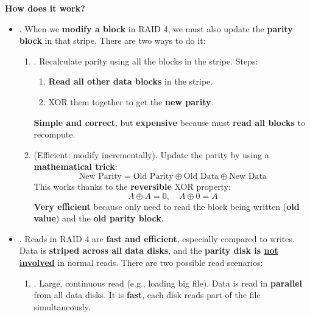 \newpage

\begin{flushleft}
    \textcolor{Green3}{ \textbf{How does it work?}}
\end{flushleft}
\begin{itemize}
    \item {}. When we \textbf{modify a block} in RAID 4, we must also update the \textbf{parity block} in that stripe. There are two ways to do it:
    \begin{enumerate}
        \item {}. Recalculate parity using all the blocks in the stripe. Steps:
        \begin{enumerate}
            \item \textbf{Read all other data blocks} in the stripe.
            \item XOR them together to get the \textbf{new parity}.
        \end{enumerate}
        \textcolor{Green3}{ \textbf{Simple and correct}}, but \textcolor{Red2}{ \textbf{expensive}} because must \textbf{read all blocks} to recompute.
        \item {} (Efficient: modify incrementally). Update the parity by using a \textbf{mathematical trick}:
        \begin{equation}
            \text{New Parity} = \text{Old Parity} \oplus \text{Old Data} \oplus \text{New Data}
        \end{equation}
        This works thanks to the \textbf{reversible} XOR property:
        \begin{equation*}
            A \oplus A = 0,\quad  A \oplus 0 = A
        \end{equation*}
        \textcolor{Green3}{ \textbf{Very efficient}} because only need to read the block being written (\textbf{old value}) and the \textbf{old parity block}.
    \end{enumerate}


    \item {}. Reads in RAID 4 are \textbf{fast and efficient}, especially compared to writes. Data is \textbf{striped across all data disks}, and the \textbf{parity disk is \underline{not involved}} in normal reads. There are two possible read scenarios:
    \begin{enumerate}
        \item {}. Large, continuous read (e.g., loading big file). Data is read in \textbf{parallel} from all data disks. It is \textbf{fast}, each disk reads part of the file simultaneously.


\end{enumerate}
\end{itemize}
